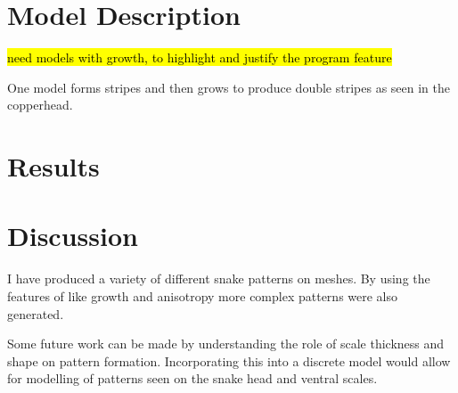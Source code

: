 \section{Model Description}
\hl{need models with growth, to highlight and justify the program feature}

One model forms stripes and then grows to produce double stripes as seen in the copperhead.

\section{Results}

\section{Discussion}
I have produced a variety of different snake patterns on meshes. By using the features of \ProgramName{} like growth and anisotropy more complex patterns were also generated. 

Some future work can be made by understanding the role of scale thickness and shape on pattern formation. Incorporating this into a discrete model would allow for modelling of patterns seen on the snake head and ventral scales.